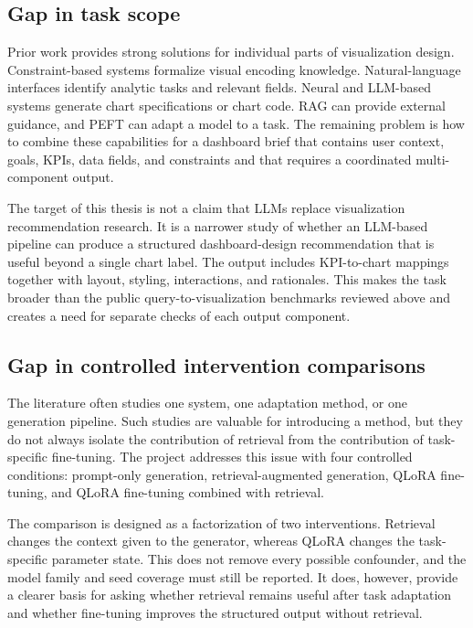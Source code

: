 \subsection{Gap in task scope}

Prior work provides strong solutions for individual parts of visualization design. Constraint-based systems formalize visual encoding knowledge. Natural-language interfaces identify analytic tasks and relevant fields. Neural and LLM-based systems generate chart specifications or chart code. RAG can provide external guidance, and PEFT can adapt a model to a task. The remaining problem is how to combine these capabilities for a dashboard brief that contains user context, goals, KPIs, data fields, and constraints and that requires a coordinated multi-component output.

The target of this thesis is not a claim that LLMs replace visualization recommendation research. It is a narrower study of whether an LLM-based pipeline can produce a structured dashboard-design recommendation that is useful beyond a single chart label. The output includes KPI-to-chart mappings together with layout, styling, interactions, and rationales. This makes the task broader than the public query-to-visualization benchmarks reviewed above and creates a need for separate checks of each output component.

\subsection{Gap in controlled intervention comparisons}

The literature often studies one system, one adaptation method, or one generation pipeline. Such studies are valuable for introducing a method, but they do not always isolate the contribution of retrieval from the contribution of task-specific fine-tuning. The project addresses this issue with four controlled conditions: prompt-only generation, retrieval-augmented generation, QLoRA fine-tuning, and QLoRA fine-tuning combined with retrieval.

The comparison is designed as a factorization of two interventions. Retrieval changes the context given to the generator, whereas QLoRA changes the task-specific parameter state. This does not remove every possible confounder, and the model family and seed coverage must still be reported. It does, however, provide a clearer basis for asking whether retrieval remains useful after task adaptation and whether fine-tuning improves the structured output without retrieval.

